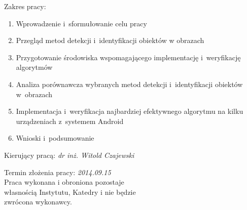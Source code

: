 \begin{titlepage}
    \vspace*{1\baselineskip}

    \begin{flushleft}
        \fontsize{12pt}{10pt}\selectfont
        Zakres pracy:
        \selectfont
        \begin{enumerate}
            \item Wprowadzenie i~sformułowanie celu pracy
            \item Przegląd metod detekcji
                i~identyfikacji obiektów w obrazach
            \item Przygotowanie środowiska wspomagającego
                implementację i~weryfikację algorytmów
            \item Analiza porównawcza wybranych
                metod detekcji i~identyfikacji obiektów w~obrazach
            \item Implementacja i~weryfikacja najbardziej efektywnego algorytmu
                na kilku urządzeniach z~systemem Android
            \item Wnioski i~podsumowanie
        \end{enumerate}
        \fontsize{12pt}{10pt}\selectfont

        \vspace*{1\baselineskip}

        Kierujący pracą: \textit{dr inż. Witold Czajewski} \\

        \vspace*{4\baselineskip}

        \selectfont
        Termin złożenia pracy: \textit{2014.09.15} \\
        \fontsize{10pt}{8pt}\selectfont
        Praca wykonana i obroniona pozostaje \\
        własnością Instytutu, Katedry i nie będzie \\
        zwrócona wykonawcy.
    \end{flushleft}
\end{titlepage}
